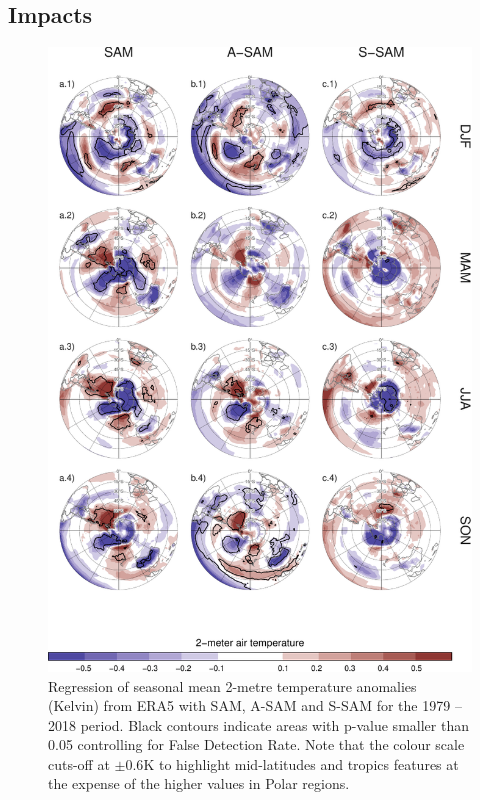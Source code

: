 \documentclass[smallextended]{svjour3}       %
\begin{document}
\hypertarget{impacts}{%
\subsection{Impacts}\label{impacts}}



\begin{figure}
\includegraphics{regr-air-season-1} \caption{Regression of seasonal mean 2-metre temperature anomalies (Kelvin) from ERA5 with SAM, A\nobreakdash-SAM and S\nobreakdash-SAM for the 1979 -- 2018 period. Black contours indicate areas with p-value smaller than 0.05 controlling for False Detection Rate. Note that the colour scale cuts-off at \(\pm0.6 \mathrm{K}\) to highlight mid-latitudes and tropics features at the expense of the higher values in Polar regions.}\label{fig:regr-air-season}
\end{figure}
\end{document}

